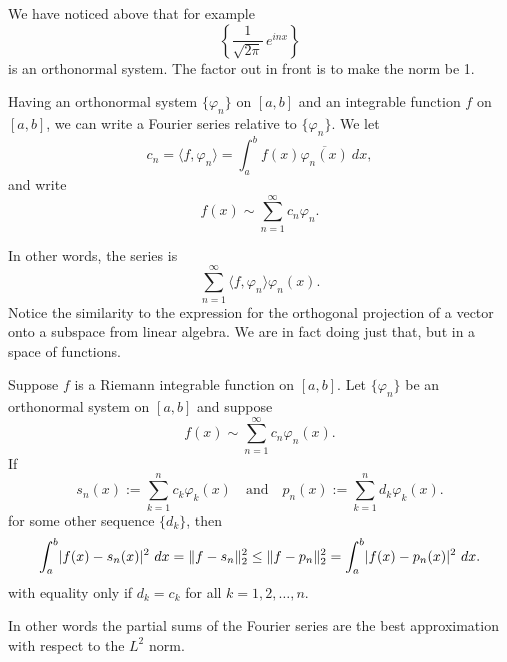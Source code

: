 We have noticed above that for example
\begin{equation*}
\left\{ \frac{1}{\sqrt{2\pi}} \, e^{inx} \right\}
\end{equation*}
is an orthonormal system.  The factor out in front is to make the norm be 1.

Having an orthonormal system $\{ \varphi_n \}$ on $[a,b]$ and an integrable function $f$
on $[a,b]$, we can write
a Fourier series relative to $\{ \varphi_n \}$.  We let
\begin{equation*}
c_n =
\langle f , \varphi_n \rangle
=
\int_a^b f(x) \overline{\varphi_n(x)} ~ dx ,
\end{equation*}
and write
\begin{equation*}
f(x) \sim \sum_{n=1}^\infty c_n \varphi_n .
\end{equation*}

In other words, the series is
\begin{equation*}
\sum_{n=1}^\infty \langle f , \varphi_n \rangle \varphi_n(x) .
\end{equation*}
Notice the similarity to the expression for the orthogonal
projection of a vector onto a subspace from linear algebra.  We are
in fact doing just that, but in a space of functions.

\begin{thm} \label{thm:l2bestapprox}
Suppose $f$ is a Riemann integrable function on $[a,b]$.
Let $\{ \varphi_n \}$ be an orthonormal system on $[a,b]$ and
suppose
\begin{equation*}
f(x) \sim \sum_{n=1}^\infty c_n \varphi_n(x) .
\end{equation*}
If
\begin{equation*}
s_n (x) := \sum_{k=1}^n c_k \varphi_k(x)
\quad\text{and}\quad
p_n (x) := \sum_{k=1}^n d_k \varphi_k(x) .
\end{equation*}
for some other sequence $\{ d_k \}$, then
\begin{equation*}
\int_a^b \lvert {f(x)-s_n(x)} \rvert^2 ~ dx = \lVert {f-s_n} \rVert_2^2 \leq
\lVert {f-p_n} \rVert_2^2 = \int_a^b \lvert {f(x)-p_n(x)} \rvert^2 ~ dx .
\end{equation*}
with equality only if $d_k = c_k$ for all $k=1,2,\ldots,n$.
\end{thm}

In other words the partial sums of the Fourier series are the best approximation with respect to the
$L^2$ norm.

